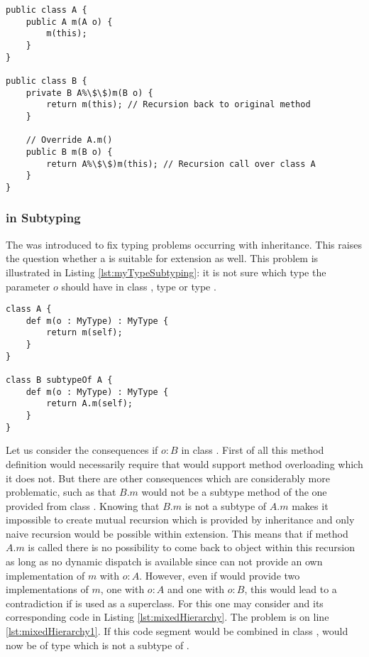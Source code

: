 \begin{lstlisting}[float=ht,caption=Subclassing with \mytype translated to Java,label=lst:javaTransMyTypeSubclassing]
public class A {
	public A m(A o) {
		m(this);
	}
}

public class B {
	private B A%\$\$)m(B o) {
		return m(this); // Recursion back to original method
	}

	// Override A.m()
	public B m(B o) {
		return A%\$\$)m(this); // Recursion call over class A
	}
}
\end{lstlisting}

\subsubsection{\mytype in Subtyping}
\label{ssec:mytypeInSubtype}
The \mytype was introduced to fix typing problems occurring with
inheritance. This raises the question whether a \mytype is suitable
for extension as well. This problem is illustrated in Listing
\ref{lst:myTypeSubtyping}: it is not sure which type the parameter
$o$ should have in class \B, type \B or type \A.

\begin{lstlisting}[float=ht,language=ooplss,caption=\mytype within subtyping contexts,label=lst:myTypeSubtyping]
class A {
	def m(o : MyType) : MyType {
		return m(self);
	}
}

class B subtypeOf A {
	def m(o : MyType) : MyType {
		return A.m(self);
	}
}
\end{lstlisting}

Let us consider the consequences if $o : B$ in class \B. First of all this
method definition would necessarily require that \ooplss would support
method overloading which it does not. But there are other consequences which
are considerably more problematic, such as that $B.m$ would not be a subtype method of the one
provided from class \A. Knowing that $B.m$ is not a subtype of $A.m$
makes it impossible to create mutual recursion which is provided by inheritance
and only naive recursion would be possible within extension. This means
that if method $A.m$ is called there is no possibility to come back to object \B
within this recursion as long as no dynamic dispatch is available since \B can
not provide an own implementation of $m$ with $o : A$. However, even if \B would
provide two implementations of $m$, one with $o : A$ and one with $o : B$, this
would lead to a contradiction if \B is used as a superclass. For this one may
consider  and its corresponding code in Listing
\ref{lst:mixedHierarchy}. The problem is on line \ref{lst:mixedHierarchy1}.
If this code segment would be combined in class \C, \self would now be of type
\C which is not a subtype of \A.

